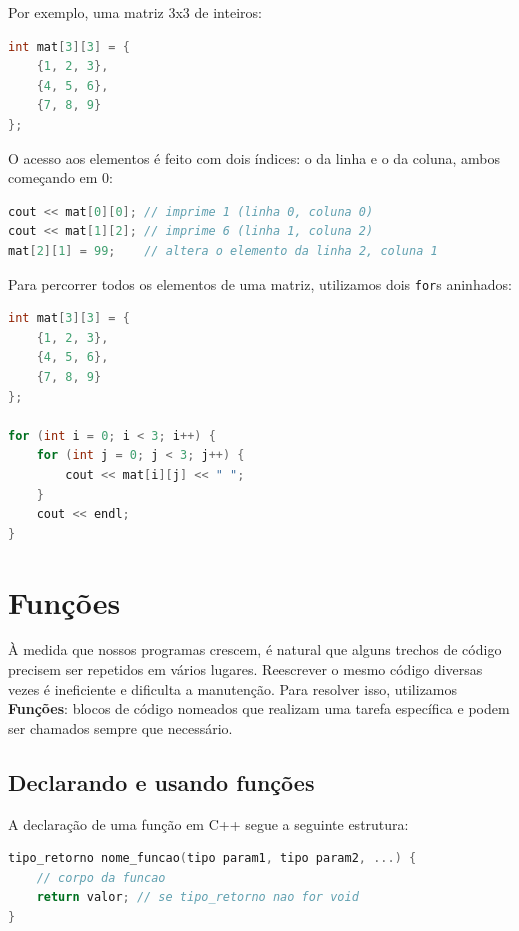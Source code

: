 \documentclass[12pt]{article}
\begin{document}
Por exemplo, uma matriz 3x3 de inteiros:

\begin{lstlisting}[language=C++]
int mat[3][3] = {
    {1, 2, 3},
    {4, 5, 6},
    {7, 8, 9}
};
\end{lstlisting}

O acesso aos elementos é feito com dois índices: o da linha e o da coluna, ambos começando em 0:

\begin{lstlisting}[language=C++]
cout << mat[0][0]; // imprime 1 (linha 0, coluna 0)
cout << mat[1][2]; // imprime 6 (linha 1, coluna 2)
mat[2][1] = 99;    // altera o elemento da linha 2, coluna 1
\end{lstlisting}

Para percorrer todos os elementos de uma matriz, utilizamos dois \texttt{for}s aninhados:

\begin{lstlisting}[language=C++]
int mat[3][3] = {
    {1, 2, 3},
    {4, 5, 6},
    {7, 8, 9}
};

for (int i = 0; i < 3; i++) {
    for (int j = 0; j < 3; j++) {
        cout << mat[i][j] << " ";
    }
    cout << endl;
}
\end{lstlisting}


\section{Funções}
À medida que nossos programas crescem, é natural que alguns trechos de código precisem ser repetidos em vários lugares. Reescrever o mesmo código diversas vezes é ineficiente e dificulta a manutenção. Para resolver isso, utilizamos \textbf{Funções}: blocos de código nomeados que realizam uma tarefa específica e podem ser chamados sempre que necessário.

\subsection{Declarando e usando funções}

A declaração de uma função em C++ segue a seguinte estrutura:

\begin{lstlisting}[language=C++]
tipo_retorno nome_funcao(tipo param1, tipo param2, ...) {
    // corpo da funcao
    return valor; // se tipo_retorno nao for void
}
\end{lstlisting}
\end{document}

